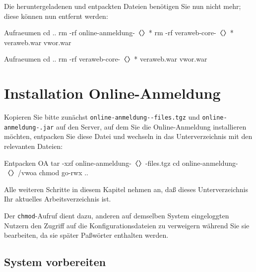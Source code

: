 \begin{minipage}{\linewidth}
Die heruntergeladenen und entpackten Dateien benötigen Sie nun nicht
mehr; diese können nun entfernt werden:

\ifoa
\begin{lstdump}{Aufraeumen}
cd ..
rm -rf online-anmeldung-〈\lstdumpesc{\vwiaverssw}〉*
rm -rf veraweb-core-〈\lstdumpesc{\vwiaverssw}〉* veraweb.war vwor.war
\end{lstdump}
\else%
\begin{lstdump}{Aufraeumen}
cd ..
rm -rf veraweb-core-〈\lstdumpesc{\vwiaverssw}〉* veraweb.war vwor.war
\end{lstdump}
\fi%
\end{minipage}

\ifoa

\section{Installation Online-Anmeldung}\label{sec:setup-oa}

\begin{minipage}{\linewidth}
Kopieren Sie bitte zunächst \texttt{online-anmeldung-\vwiaverssw{}-files.tgz}
und \texttt{online-anmeldung-\vwiaverssw{}.jar}
auf den Server, auf dem Sie die Online-Anmeldung installieren möchten,
entpacken Sie diese Datei und wechseln in das Unterverzeichnis mit den
relevanten Dateien:

\begin{lstdump}{Entpacken OA}
tar -xzf online-anmeldung-〈\lstdumpesc{\vwiaverssw}〉-files.tgz
cd online-anmeldung-〈\lstdumpesc{\vwiaverssw}〉/vwoa
chmod go-rwx ..
\end{lstdump}
\end{minipage}

Alle weiteren Schritte in diesem Kapitel nehmen an, daß dieses
Unterverzeichnis Ihr aktuelles Arbeitsverzeichnis ist.

Der \texttt{chmod}-Aufruf dient dazu, anderen auf demselben System
eingeloggten Nutzern den Zugriff auf die Konfigurationsdateien zu
verweigern während Sie sie bearbeiten, da sie später Paßwörter
enthalten werden.

\subsection{System vorbereiten}\label{subsec:setup-oa-prep}

